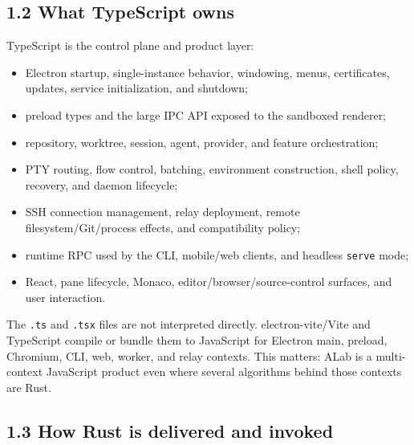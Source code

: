\documentclass[
  10pt,
  letterpaper,
]{article}
\providecommand{\tightlist}{%
  \setlength{\itemsep}{0pt}\setlength{\parskip}{0pt}}
\begin{document}
\subsection{1.2 What TypeScript owns}\label{12-what-typescript-owns}

TypeScript is the control plane and product layer:

\begin{itemize}
\tightlist
\item
  Electron startup, single-instance behavior, windowing, menus,
  certificates, updates, service initialization, and shutdown;
\item
  preload types and the large IPC API exposed to the sandboxed renderer;
\item
  repository, worktree, session, agent, provider, and feature
  orchestration;
\item
  PTY routing, flow control, batching, environment construction, shell
  policy, recovery, and daemon lifecycle;
\item
  SSH connection management, relay deployment, remote
  filesystem/Git/process effects, and compatibility policy;
\item
  runtime RPC used by the CLI, mobile/web clients, and headless
  \texttt{serve} mode;
\item
  React, pane lifecycle, Monaco, editor/browser/source-control surfaces,
  and user interaction.
\end{itemize}

The \texttt{.ts} and \texttt{.tsx} files are not interpreted directly.
electron-vite/Vite and TypeScript compile or bundle them to JavaScript
for Electron main, preload, Chromium, CLI, web, worker, and relay
contexts. This matters: ALab is a multi-context JavaScript product even
where several algorithms behind those contexts are Rust.

\subsection{1.3 How Rust is delivered and
invoked}\label{13-how-rust-is-delivered-and-invoked}
\end{document}
